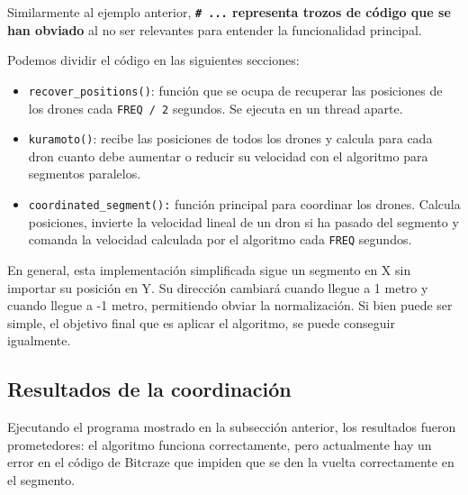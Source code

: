 Similarmente al ejemplo anterior, \textbf{\texttt{\# ...} representa trozos de código que se han obviado} al no ser
relevantes para entender la funcionalidad principal.

Podemos dividir el código en las siguientes secciones:

\begin{itemize}
    \item \texttt{recover\_positions()}: función que se ocupa de recuperar las posiciones de los drones 
    cada \texttt{FREQ / 2} segundos. Se ejecuta en un thread aparte.
    \item \texttt{kuramoto()}: recibe las posiciones de todos los drones y calcula para cada dron cuanto debe
    aumentar o reducir su velocidad con el algoritmo para segmentos paralelos.
    \item \texttt{coordinated\_segment():} función principal para coordinar los drones.
    Calcula posiciones, invierte la velocidad lineal de un dron si ha pasado del segmento y 
    comanda la velocidad calculada por el algoritmo cada \texttt{FREQ} segundos.
\end{itemize}

En general, esta implementación simplificada sigue un segmento en X sin importar su posición en Y.
Su dirección cambiará cuando llegue a 1 metro y cuando llegue a -1 metro, permitiendo obviar la normalización.
Si bien puede ser simple, el objetivo final que es aplicar el algoritmo, se puede conseguir igualmente.


\subsection{Resultados de la coordinación}

Ejecutando el programa mostrado en la subsección anterior, los resultados fueron prometedores: 
el algoritmo funciona correctamente, pero actualmente hay un error en el código de Bitcraze que impiden que se den la vuelta correctamente en el segmento.

